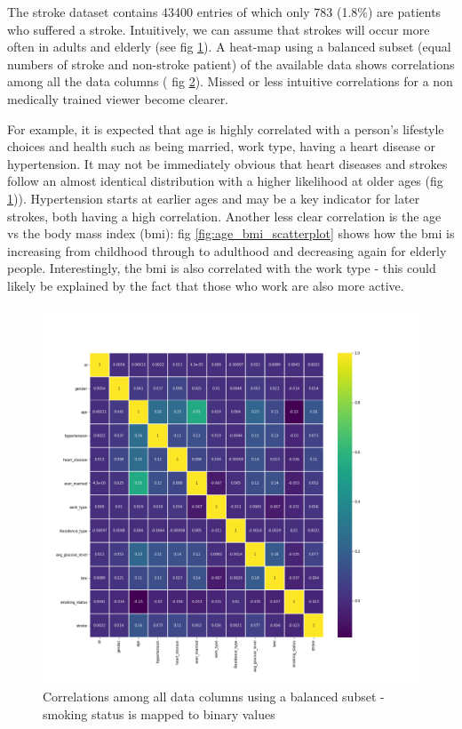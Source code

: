 \documentclass[proposal]{softeng}
\begin{document}
\begin{figure}
\begin{minipage}[t]{.5\textwidth}
  \label{fig:age_of_stroke_patients}
\end{minipage}
\end{figure}

The stroke dataset contains 43400 entries of which only 783 (1.8\%) are patients who suffered a stroke. Intuitively, we can assume that strokes will occur more often in adults and elderly (see fig \ref{fig:age_of_stroke_patients}). A heat-map using a balanced subset (equal numbers of stroke and non-stroke patient) of the available data shows correlations among all the data columns ( fig \ref{fig:heatmap}). Missed or less intuitive correlations for a non medically trained viewer become clearer. 

For example, it is expected that age is highly correlated with a person's lifestyle choices and health such as being married, work type, having a heart disease or hypertension. It may not be immediately obvious that heart diseases and strokes follow an almost identical distribution with a higher likelihood at older ages (fig \ref{fig:age_of_stroke_patients})). Hypertension starts at earlier ages and may be a key indicator for later strokes, both having a high correlation. Another less clear correlation is the age vs the body mass index (bmi): fig \ref{fig:age_bmi_scatterplot} shows how the bmi is increasing from childhood through to adulthood and decreasing again for elderly people. Interestingly, the bmi is also correlated with the work type - this could likely be explained by the fact that those who work are also more active.

\begin{figure}[h!]
\centering
  \includegraphics[width=.73\textwidth]{images/building_ann/heatmap.png}
  \caption{Correlations among all data columns using a balanced subset - smoking status is mapped to binary values}
  \label{fig:heatmap}
\end{figure}
\end{document}
